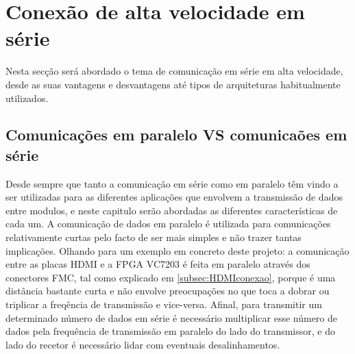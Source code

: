 \section{Conexão de alta velocidade em série} \label{sec:conexaoSerie}

Nesta secção será abordado o tema de comunicação em série em alta velocidade, desde as suas vantagens e desvantagens até tipos de arquiteturas habitualmente utilizados.

\subsection{Comunicações em paralelo VS comunicaões em série}

Desde sempre que tanto a comunicação em série como em paralelo têm vindo a ser utilizadas para as diferentes aplicações que envolvem a transmissão de dados entre modulos, e neste capitulo serão abordadas as diferentes características de cada um. A comunicação de dados em paralelo é utilizada para comunicações relativamente curtas pelo facto de ser mais simples e não trazer tantas implicações. Olhando para um exemplo em concreto deste projeto: a comunicação entre as placas HDMI e a FPGA VC7203 é feita em paralelo através dos conectores FMC, tal como explicado em \ref{subsec:HDMIconexao}, porque é uma distância bastante curta e não envolve preocupações no que toca a dobrar ou triplicar a freqência de transmissão e vice-versa. Afinal, para transmitir um determinado número de dados em série é necessário multiplicar esse número de dados pela frequência de transmissão em paralelo do lado do transmissor, e do lado do recetor é necessário lidar com eventuais desalinhamentos. 

